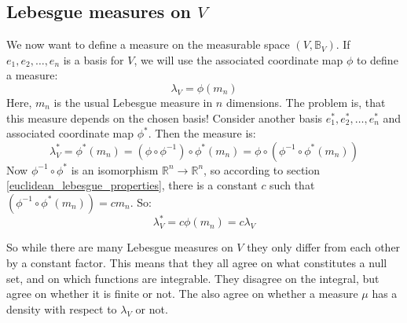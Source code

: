 \documentclass[12pt, a4paper]{article}
\numberwithin{equation}{section}
\begin{document}
\subsection{Lebesgue measures on $V$}
We now want to define a measure on the measurable space $(V,\mathbb{B}_V)$. If $e_1, e_2,\ldots, e_n$ is a basis for $V$, we will use the associated coordinate map $\phi$ to define a measure:
\begin{equation}
\lambda_V=\phi(m_n)
\end{equation}
Here, $m_n$ is the usual Lebesgue measure in $n$ dimensions. The problem is, that this measure depends on the chosen basis! Consider another basis $e^*_1, e^*_2,\ldots,e^*_n$ and associated coordinate map $\phi^*$. Then the measure is:
\begin{equation}
\lambda^*_V=\phi^*(m_n)=(\phi\circ\phi^{-1})\circ\phi^*(m_n)=\phi\circ(\phi^{-1}\circ\phi^*(m_n))
\end{equation}
Now $\phi^{-1}\circ\phi^*$ is an isomorphism $\mathbb{R}^n\rightarrow\mathbb{R}^n$, so according to section \ref{euclidean_lebesgue_properties}, there is a constant $c$ such that $(\phi^{-1}\circ\phi^*(m_n))=c m_n$. So:
\begin{equation}
\lambda^*_V=c\phi(m_n)=c\lambda_V
\end{equation}

So while there are many Lebesgue measures on $V$ they only differ from each other by a constant factor. This means that they all agree on what constitutes a null set, and on which functions are integrable. They disagree on the integral, but agree on whether it is finite or not. The also agree on whether a measure $\mu$ has a density with respect to $\lambda_V$ or not.
\end{document}
